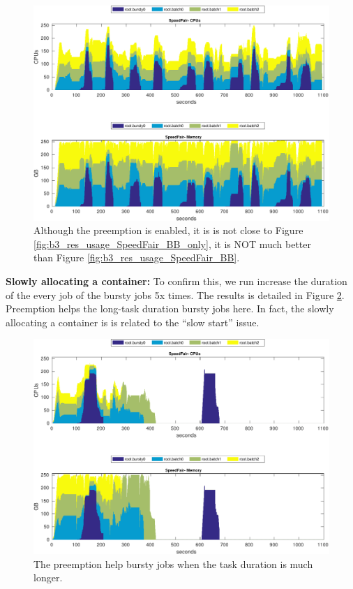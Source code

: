 \begin{figure}
\centering
\includegraphics[width=1.0\linewidth]{fig/b3_res_usage_SpeedFair_BB_preemption}
\caption{ Although the preemption is enabled, it is is not close to Figure \ref{fig:b3_res_usage_SpeedFair_BB_only}, it is NOT much better than Figure \ref{fig:b3_res_usage_SpeedFair_BB}.}
\label{fig:b3_res_usage_SpeedFair_BB_preemption}
\end{figure}

\textbf{Slowly allocating a container:} To confirm this, we run increase the duration of the every job of the bursty jobs 5x times. The results is detailed in Figure \ref{fig:b3_res_usage_SpeedFair_BB_5x}. Preemption helps the long-task duration bursty jobs here. In fact, the slowly allocating a container is  is related to the ``slow start'' issue.

\begin{figure}
\centering
\includegraphics[width=1.0\linewidth]{fig/b3_res_usage_SpeedFair_BB_5x}
\caption{ The preemption help bursty jobs when the task duration is much longer.}
\label{fig:b3_res_usage_SpeedFair_BB_5x}
\end{figure}



